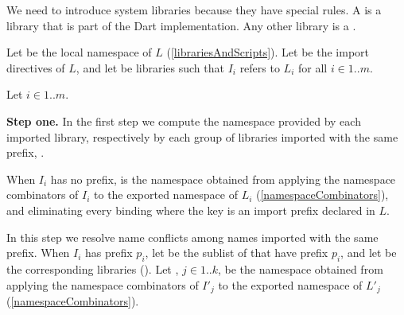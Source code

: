 \documentclass[makeidx]{article}
\begin{document}
{\LMHash{}%
We need to introduce system libraries because they have special rules.
A  is a library that is part of the Dart implementation.
Any other library is a .



\LMHash{}%
Let  be the local namespace of $L$
(\ref{librariesAndScripts}).
Let  be the import directives of $L$,
and let  be libraries
such that $I_i$ refers to $L_i$ for all $i \in 1 .. m$.

\LMHash{}%
Let $i \in 1 .. m$.

\LMHash{}%
{\bf Step one.}
In the first step we compute the namespace provided by each imported library,
respectively by each group of libraries imported with the same prefix,
.

\LMHash{}%
When $I_i$ has no prefix,  is
the namespace obtained from applying the namespace combinators of $I_i$ to
the exported namespace of $L_i$
(\ref{namespaceCombinators}),
and eliminating every binding
where the key is an import prefix declared in $L$.

\EndCase

\LMHash{}%
In this step we resolve name conflicts
among names imported with the same prefix.
When $I_i$ has prefix $p_i$,
let  be the sublist of  that have prefix $p_i$,
and let  be the corresponding libraries
().
Let , $j \in 1 .. k$,
be the namespace obtained from applying the namespace combinators of $I'_j$ to
the exported namespace of $L'_j$
(\ref{namespaceCombinators}).

}
\end{document}
